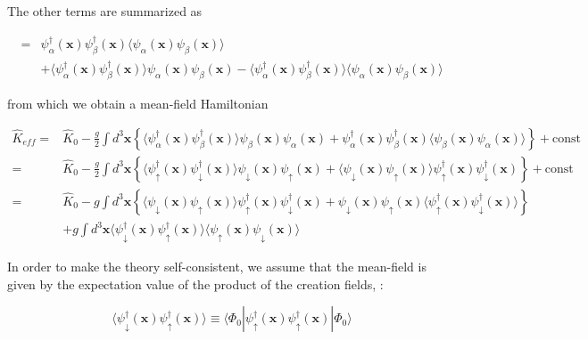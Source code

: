 ﻿\documentclass[twoside]{book}
\numberwithin{equation}{section}
\begin{document}
The other terms are summarized as 

\[\begin{split}
 =&\psi^{\dagger}_{\alpha}(\bm{x})\psi^{\dagger}_{\beta}(\bm{x})\langle\psi_{\alpha}(\bm{x})\psi_{\beta}(\bm{x})\rangle\\
& + \langle\psi^{\dagger}_{\alpha}(\bm{x})\psi^{\dagger}_{\beta}(\bm{x})\rangle\psi_{\alpha}(\bm{x})\psi_{\beta}(\bm{x}) - \langle\psi^{\dagger}_{\alpha}(\bm{x})\psi^{\dagger}_{\beta}(\bm{x})\rangle\langle\psi_{\alpha}(\bm{x})\psi_{\beta}(\bm{x})\rangle \end{split} \]

from which we obtain a mean-field Hamiltonian 

\[\begin{split}\hat{K}_{eff} =& \hat{K}_0 - \frac{g}{2} \int d^3 \bm{x} \left\{\langle\psi^{\dagger}_{\alpha}(\bm{x})\psi^{\dagger}_{\beta}(\bm{x})\rangle\psi_{\beta}(\bm{x})\psi_{\alpha}(\bm{x}) +\psi^{\dagger}_{\alpha}(\bm{x})\psi^{\dagger}_{\beta}(\bm{x}) \langle\psi_{\beta}(\bm{x})\psi_{\alpha}(\bm{x})\rangle\right\} + \text{const}\\
=& \hat{K}_0 - \frac{g}{2} \int d^3 \bm{x} \left\{\langle\psi^{\dagger}_{\uparrow}(\bm{x})\psi^{\dagger}_{\downarrow}(\bm{x})\rangle\psi_{\downarrow}(\bm{x})\psi_{\uparrow}(\bm{x}) +\langle\psi_{\downarrow}(\bm{x})\psi_{\uparrow}(\bm{x})\rangle\psi^{\dagger}_{\uparrow}(\bm{x})\psi^{\dagger}_{\downarrow}(\bm{x}) \right\} + \text{const}\\
 =&\hat{K}_0 - g\int d^3\bm{x} \left\{\langle\psi_{\downarrow}(\bm{x})\psi_{\uparrow}(\bm{x})\rangle\psi^{\dagger}_{\uparrow}(\bm{x})\psi^{\dagger}_{\downarrow}(\bm{x}) +\psi_{\downarrow}(\bm{x})\psi_{\uparrow}(\bm{x})\langle\psi^{\dagger}_{\uparrow}(\bm{x})\psi^{\dagger}_{\downarrow}(\bm{x})\rangle \right\}\\
&+g\int d^3 \bm{x} \langle\psi^{\dagger}_{\downarrow}(\bm{x})\psi^{\dagger}_{\uparrow}(\bm{x})\rangle \langle\psi_{\uparrow}(\bm{x})\psi_{\downarrow}(\bm{x})\rangle
 \end{split}\]

In order to make the theory self-consistent, we assume that the mean-field is given by the expectation value of the product of the creation fields, :

\[\langle\psi_{\downarrow}^\dagger(\bm{x})\psi_\uparrow^\dagger(\bm{x})\rangle \equiv \langle\Phi_0|\psi_\uparrow^\dagger(\bm{x})\psi_\uparrow^\dagger(\bm{x})|\Phi_0\rangle \]
\end{document}

